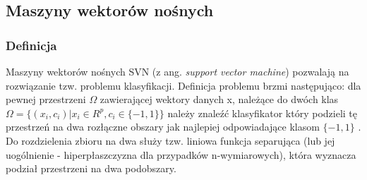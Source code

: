 \subsection{Maszyny wektorów nośnych}

\subsubsection{Definicja} 

Maszyny wektorów nośnych SVN (z ang. \textit{support vector machine}) pozwalają na rozwiązanie tzw. problemu klasyfikacji. Definicja problemu brzmi następująco: dla pewnej przestrzeni $\Omega$ zawierającej wektory danych x, należące do dwóch klas
$\Omega = \{(x_{i}, c_{i}) | x_{i} \in R^p, c_{i} \in \{-1,1\}\}$
należy znaleźć klasyfikator który podzieli tę przestrzeń na dwa rozłączne obszary jak najlepiej odpowiadające klasom $\{-1, 1\}$ \cite{stefanowski2010}. Do rozdzielenia zbioru na dwa służy tzw. liniowa funkcja separująca (lub jej uogólnienie - hiperpłaszczyzna dla przypadków n-wymiarowych), która wyznacza podział przestrzeni na dwa podobszary.

